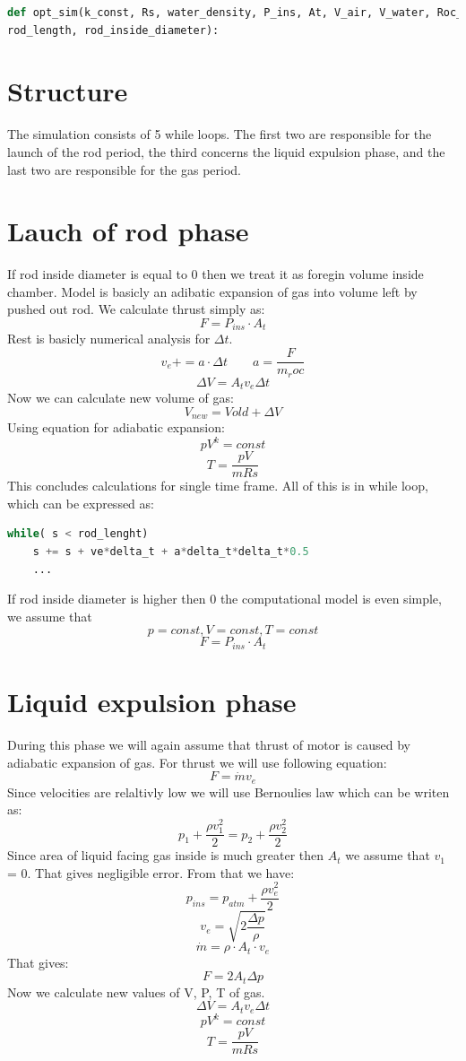 \documentclass{report}
\begin{document}
\begin{lstlisting}[language=Python]
def opt_sim(k_const, Rs, water_density, P_ins, At, V_air, V_water, Roc_mass, T,
rod_length, rod_inside_diameter):
\end{lstlisting}

\section{Structure}
The simulation consists of 5 while loops. The first two are responsible for the launch of the rod period, the third concerns the liquid expulsion phase, and the last two are responsible for the gas period.

\section{Lauch of rod phase}
If rod inside diameter is equal to 0 then we treat it as foregin volume inside chamber. Model is basicly an adibatic expansion of gas into volume left by pushed out rod. We calculate thrust simply as:
$$F = P_{ins} \cdot A_t$$
Rest is basicly numerical analysis for $\Delta t$.
$$v_e += a \cdot \Delta t \qquad a = \frac{F}{m_roc}$$
$$ \Delta V = A_t v_e \Delta t$$
Now we can calculate new volume of gas:
$$ V_{new} = V{old} + \Delta V$$
Using equation for adiabatic expansion:
$$ p V^k = const$$
$$ T = \frac{p V}{m Rs}$$
This concludes calculations for single time frame. All of this is in while loop, which can be expressed as:
\begin{lstlisting}[language=Python]
while( s < rod_lenght)
	s += s + ve*delta_t + a*delta_t*delta_t*0.5
	...
\end{lstlisting}
If rod inside diameter is higher then 0 the computational model is even simple, we assume that $$p=const, V=const, T=const$$
$$F=P_{ins}\cdot A_t$$

\section{Liquid expulsion phase}
During this phase we will again assume that thrust of motor is caused by adiabatic expansion of gas. For thrust we will use following equation:
$$F = \dot{m} v_e$$
Since velocities are relaltivly low we will use Bernoulies law which can be writen as:
$$ p_1 + \frac{\rho v_1^2}{2} = p_2 + \frac{\rho v_2^2}{2} $$
Since area of liquid facing gas inside is much greater then $A_t$ we assume that $v_1$ = 0. That gives negligible error.  From that we have:
$$ p_{ins} = p_{atm} + \frac{\rho v_e^2}{2} $$
$$v_e = \sqrt{2\frac{\Delta p}{\rho}}$$
$$\dot{m} = \rho\cdot A_t\cdot v_e$$
That gives:
$$ F = 2 A_t \Delta p$$
Now we calculate new values of V, P, T of gas.
$$\Delta V = A_t v_e \Delta t$$
$$pV^k = const$$
$$ T = \frac{p V}{m Rs}$$
\end{document}
